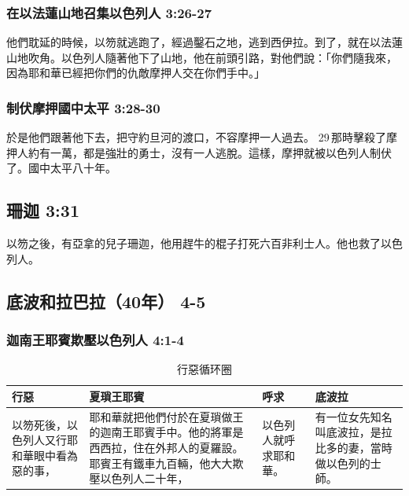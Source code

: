 \subsubsection{在以法蓮山地召集以色列人 3:26-27}
他們耽延的時候，以笏就逃跑了，經過鑿石之地，逃到西伊拉。到了，就在以法蓮山地吹角。以色列人隨著他下了山地，他在前頭引路，對他們說：「你們隨我來，因為耶和華已經把你們的仇敵摩押人交在你們手中。」

\subsubsection{制伏摩押國中太平 3:28-30}
於是他們跟著他下去，把守約旦河的渡口，不容摩押一人過去。 29 那時擊殺了摩押人約有一萬，都是強壯的勇士，沒有一人逃脫。這樣，摩押就被以色列人制伏了。國中太平八十年。	
	  
\subsection{珊迦 3:31}
以笏之後，有亞拿的兒子珊迦，他用趕牛的棍子打死六百非利士人。他也救了以色列人。

\subsection{底波和拉巴拉（40年） 4-5}
\subsubsection{迦南王耶賓欺壓以色列人 4:1-4}
\begin{table}[H]
\centering
\begin{tabular}{p{2.7cm}|p{}|p{1.7cm}|p{3.5cm}}\hline\hline
行惡&夏瑣王耶賓&呼求&底波拉\\\hline
以笏死後，以色列人又行耶和華眼中看為惡的事，
&耶和華就把他們付於在夏瑣做王的迦南王耶賓手中。他的將軍是西西拉，住在外邦人的夏羅設。耶賓王有鐵車九百輛，他大大欺壓以色列人二十年，
&以色列人就呼求耶和華。
&有一位女先知名叫底波拉，是拉比多的妻，當時做以色列的士師。\\\hline
 \end{tabular}
\caption{行惡循环圈}
\end{table}


